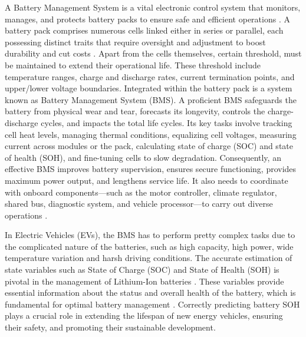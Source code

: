 

A Battery Management System is a vital electronic control system that monitors, manages, and protects battery packs to ensure safe and efficient operations \cite{wevj-12-00120-v2}. A battery pack comprises numerous cells linked either in series or parallel, each possessing distinct traits that require oversight and adjustment to boost durability and cut costs \cite{energies-18-00342-v2}\cite{wevj-12-00120-v2}. Apart from the cells themselves, certain threshold, must be maintained to extend their operational life. These threshold include temperature ranges, charge and discharge rates, current termination points, and upper/lower voltage boundaries. Integrated within the battery pack is a system known as Battery Management System (BMS). A proficient BMS safeguards the battery from physical wear and tear, forecasts its longevity, controls the charge-discharge cycles, and impacts the total life cycles. Its key tasks involve tracking cell heat levels, managing thermal conditions, equalizing cell voltages, measuring current across modules or the pack, calculating state of charge (SOC) and state of health (SOH), and fine-tuning cells to slow degradation. Consequently, an effective BMS improves battery supervision, ensures secure functioning, provides maximum power output, and lengthens service life. It also needs to coordinate with onboard components—such as the motor controller, climate regulator, shared bus, diagnostic system, and vehicle processor—to carry out diverse operations \cite{wevj-12-00120-v2}. 

In Electric Vehicles (EVs), the BMS has to perform pretty complex tasks due to the complicated nature of the batteries, such as high capacity, high power, wide temperature variation and harsh driving conditions. The accurate estimation of state variables such as State of Charge (SOC) and State of Health (SOH) is pivotal in the management of Lithium-Ion batteries \cite{105207_1_5.0172683}. These variables provide essential information about the status and overall health of the battery, which is fundamental for optimal battery management \cite{105207_1_5.0172683}. Correctly predicting battery SOH plays a crucial role in extending the lifespan of new energy vehicles, ensuring their safety, and promoting their sustainable development\cite{electronics-13-01675}. 


